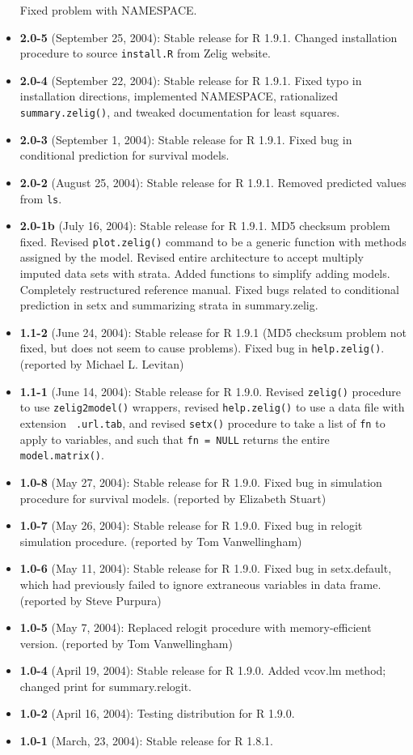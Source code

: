 \begin{itemize}
Fixed problem with NAMESPACE.  
\item \textbf{2.0-5} (September 25, 2004): Stable release for R 1.9.1.  
Changed installation procedure to source {\tt install.R} from Zelig 
website.
\item \textbf{2.0-4} (September 22, 2004): Stable release for R 1.9.1.  Fixed 
typo in installation directions, implemented NAMESPACE, rationalized {\tt 
summary.zelig()}, and tweaked documentation for least squares.  
\item \textbf{2.0-3} (September 1, 2004): Stable release for 
R 1.9.1.  Fixed bug in conditional prediction for survival models.  
\item \textbf{2.0-2} (August 25, 2004): Stable release for R 1.9.1.  
Removed predicted values from {\tt ls}.  
\item \textbf{2.0-1b} (July 16, 2004): Stable release for R 1.9.1.  MD5
  checksum problem fixed.  Revised {\tt plot.zelig()} command to be a
  generic function with methods assigned by the model.  Revised entire
  architecture to accept multiply imputed data sets with strata.
  Added functions to simplify adding models.  Completely restructured
  reference manual.  Fixed bugs related to conditional prediction in
  setx and summarizing strata in summary.zelig.
 \item \textbf{1.1-2} (June 24, 2004): Stable release for R 1.9.1 (MD5
  checksum problem not fixed, but does not seem to cause problems).
  Fixed bug in {\tt help.zelig()}.  (reported by Michael L. Levitan)
\item \textbf{1.1-1} (June 14, 2004): Stable release for R 1.9.0.
  Revised {\tt zelig()} procedure to use {\tt zelig2model()} wrappers,
  revised {\tt help.zelig()} to use a data file with extension {\tt
    .url.tab}, and revised {\tt setx()} procedure to take a list of
  {\tt fn} to apply to variables, and such that {\tt fn = NULL}
  returns the entire {\tt model.matrix()}.
 \item \textbf{1.0-8} (May 27, 2004): Stable release for R 1.9.0.
   Fixed bug in simulation procedure for survival models.  (reported
   by Elizabeth Stuart) 
 \item \textbf{1.0-7} (May 26, 2004): Stable release for R 1.9.0. Fixed 
   bug in relogit simulation procedure.  (reported by Tom Vanwellingham)
 \item \textbf{1.0-6} (May 11, 2004):  Stable release for R 1.9.0.  
   Fixed bug in setx.default, which had previously failed to ignore 
   extraneous variables in data frame.  (reported by Steve Purpura) 
 \item \textbf{1.0-5} (May 7, 2004): Replaced relogit procedure with 
   memory-efficient version. (reported by Tom Vanwellingham)
 \item \textbf{1.0-4} (April 19, 2004):  Stable release for R 1.9.0.  
   Added vcov.lm method; changed print for summary.relogit. 
 \item \textbf{1.0-2} (April 16, 2004): Testing distribution for R 1.9.0. 
 \item \textbf{1.0-1} (March, 23, 2004): Stable release for R 1.8.1. 
\end{itemize}

